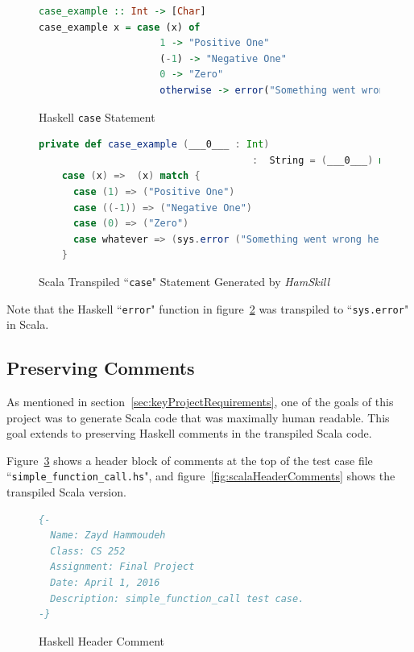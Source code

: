 \documentclass{report}
\begin{document}
\begin{figure}[H]
\begin{mdframed}
\begin{lstlisting}[language=Haskell, basicstyle=\scriptsize, showstringspaces=false]
case_example :: Int -> [Char]
case_example x = case (x) of
                     1 -> "Positive One"
                     (-1) -> "Negative One"
                     0 -> "Zero"
                     otherwise -> error("Something went wrong here")
\end{lstlisting}
\end{mdframed}
\caption{Haskell \texttt{case} Statement}\label{fig:haskellCaseStatement}
\end{figure}

\begin{figure}[H]
\begin{mdframed}
\begin{lstlisting}[language=Scala, basicstyle=\scriptsize]
private def case_example (___0___ : Int) 
                                     :  String = (___0___) match {
    case (x) =>  (x) match {
      case (1) => ("Positive One")
      case ((-1)) => ("Negative One")
      case (0) => ("Zero")
      case whatever => (sys.error ("Something went wrong here"))
    }
\end{lstlisting}
\end{mdframed}
\caption{Scala Transpiled ``\texttt{case}" Statement Generated by \textit{HamSkill}}\label{fig:scalaCaseStatement}
\end{figure}

Note that the Haskell ``\texttt{error}" function in figure~\ref{fig:scalaCaseStatement} was transpiled to ``\texttt{sys.error}" in Scala.

\subsection{Preserving Comments}\label{sec:preservingComments}

As mentioned in section~\ref{sec:keyProjectRequirements}, one of the goals of this project was to generate Scala code that was maximally human readable.  This goal extends to preserving Haskell comments in the transpiled Scala code.

Figure~\ref{fig:haskellHeaderComments} shows a header block of comments at the top of the test case file ``\texttt{simple\_function\_call.hs}", and figure~\ref{fig:scalaHeaderComments} shows the transpiled Scala version.  

\begin{figure}[H]
\begin{mdframed}
\begin{lstlisting}[language=Haskell]
{-
  Name: Zayd Hammoudeh
  Class: CS 252
  Assignment: Final Project
  Date: April 1, 2016
  Description: simple_function_call test case.
-}
\end{lstlisting}
\end{mdframed}
\caption{Haskell Header Comment}\label{fig:haskellHeaderComments}
\end{figure}
\end{document}
